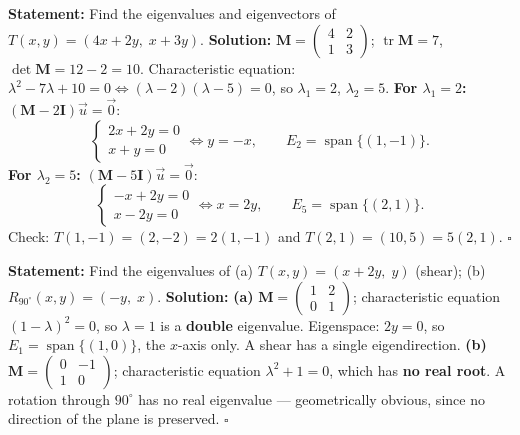 \documentclass[11pt]{article}
\begin{document}
\begin{exoresolu}
\noindent\textbf{Statement:} Find the eigenvalues and eigenvectors of $T(x,y) = (4x + 2y,\; x + 3y)$.
\tcblower
\noindent\textbf{Solution:}
$\mathbf{M} = \begin{pmatrix}4&2\\1&3\end{pmatrix}$; $\operatorname{tr}\mathbf{M} = 7$, $\det\mathbf{M} = 12 - 2 = 10$.
Characteristic equation: $\lambda^2 - 7\lambda + 10 = 0 \iff (\lambda-2)(\lambda-5) = 0$, so $\lambda_1 = 2$, $\lambda_2 = 5$.
\textbf{For $\lambda_1 = 2$:} $(\mathbf{M} - 2\mathbf{I})\vec{u} = \vec{0}$:
\[
\begin{cases} 2x + 2y = 0 \\ x + y = 0 \end{cases} \iff y = -x,
\qquad E_2 = \operatorname{span}\{(1,-1)\}.
\]
\textbf{For $\lambda_2 = 5$:} $(\mathbf{M} - 5\mathbf{I})\vec{u} = \vec{0}$:
\[
\begin{cases} -x + 2y = 0 \\ x - 2y = 0 \end{cases} \iff x = 2y,
\qquad E_5 = \operatorname{span}\{(2,1)\}.
\]
Check: $T(1,-1) = (2,-2) = 2(1,-1)$ and $T(2,1) = (10,5) = 5(2,1)$. \hfill$\square$
\end{exoresolu}

\begin{exoresolu}
\noindent\textbf{Statement:} Find the eigenvalues of (a) $T(x,y) = (x+2y,\; y)$ (shear); (b) $R_{90^\circ}(x,y) = (-y,\; x)$.
\tcblower
\noindent\textbf{Solution:}
\textbf{(a)} $\mathbf{M} = \begin{pmatrix}1&2\\0&1\end{pmatrix}$; characteristic equation $(1-\lambda)^2 = 0$, so $\lambda = 1$ is a \textbf{double} eigenvalue. Eigenspace: $2y = 0$, so $E_1 = \operatorname{span}\{(1,0)\}$, the $x$-axis only. A shear has a single eigendirection.
\textbf{(b)} $\mathbf{M} = \begin{pmatrix}0&-1\\1&0\end{pmatrix}$; characteristic equation $\lambda^2 + 1 = 0$, which has \textbf{no real root}. A rotation through $90^\circ$ has no real eigenvalue — geometrically obvious, since no direction of the plane is preserved. \hfill$\square$
\end{exoresolu}
\end{document}

